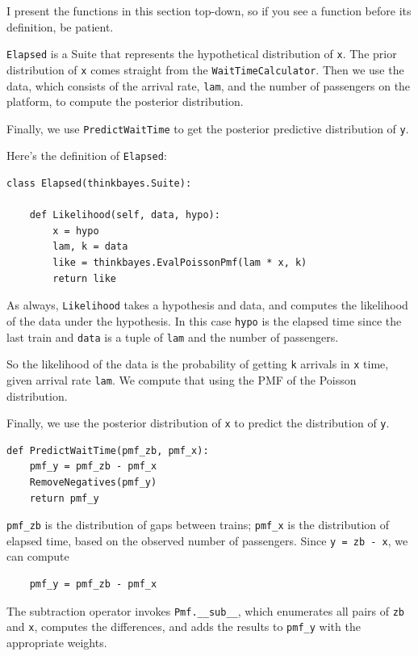 \documentclass[12pt]{book}
\begin{document}
I present the functions in this section top-down, so if you see a
function before its definition, be patient.

{\tt Elapsed} is a Suite that represents the hypothetical
distribution of {\tt x}.  The prior distribution of {\tt x}
comes straight from the {\tt WaitTimeCalculator}.  Then we
use the data, which consists of the arrival rate, {\tt lam},
and the number of passengers on the platform, to compute
the posterior distribution.

Finally, we use {\tt PredictWaitTime} to get the posterior
predictive distribution of {\tt y}.

Here's the definition of {\tt Elapsed}:

\begin{verbatim}
class Elapsed(thinkbayes.Suite):

    def Likelihood(self, data, hypo):
        x = hypo
        lam, k = data
        like = thinkbayes.EvalPoissonPmf(lam * x, k)
        return like
\end{verbatim}

As always, {\tt Likelihood} takes a hypothesis and data, and
computes the likelihood of the data under the hypothesis.
In this case {\tt hypo} is the elapsed time since the last train
and {\tt data} is a tuple of {\tt lam} and the number of
passengers.

So the likelihood of the data is the probability of getting
{\tt k} arrivals in {\tt x} time, given arrival rate
{\tt lam}.  We compute that using the PMF of the Poisson
distribution.

Finally, we use the posterior distribution of {\tt x}
to predict the distribution of {\tt y}.

\begin{verbatim}
def PredictWaitTime(pmf_zb, pmf_x):
    pmf_y = pmf_zb - pmf_x
    RemoveNegatives(pmf_y)
    return pmf_y
\end{verbatim}

\verb"pmf_zb" is the distribution of gaps between trains;
\verb"pmf_x" is the distribution of elapsed time, based on
the observed number of passengers.  Since {\tt y = zb - x},
we can compute

\begin{verbatim}
    pmf_y = pmf_zb - pmf_x
\end{verbatim}

The subtraction operator invokes \verb"Pmf.__sub__", which enumerates
all pairs of {\tt zb} and {\tt x}, computes the differences, and adds
the results to \verb"pmf_y" with the appropriate weights.
\end{document}
